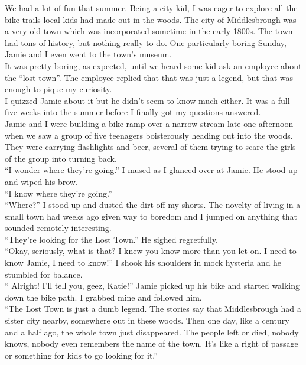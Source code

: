 \documentclass[a5paper]{scrartcl}
\begin{document}
We had a lot of fun that summer. Being a city kid, I was eager to explore all the bike trails local kids had made out in the woods. The city of Middlesbrough was a very old town which was incorporated sometime in the early 1800s. The town had tons of history, but nothing really to do. One particularly boring Sunday, Jamie and I even went to the town's museum. \\


It was pretty boring, as expected, until we heard some kid ask an employee about the \enquote{lost town}. The employee replied that that was just a legend, but that was enough to pique my curiosity.\\


I quizzed Jamie about it but he didn't seem to know much either. It was a full five weeks into the summer before I finally got my questions answered.\\


Jamie and I were building a bike ramp over a narrow stream late one afternoon when we saw a group of five teenagers boisterously heading out into the woods. They were carrying flashlights and beer, several of them trying to scare the girls of  the group into turning back.\\


\enquote{I wonder where they're going.} I mused as I glanced over at Jamie. He stood up and wiped his brow. \\


\enquote{I know where they're going.}\\


\enquote{Where?} I stood up and dusted the dirt off my shorts. The novelty of living in a small town had weeks ago given way to boredom and I jumped on anything that sounded remotely interesting.  \\


\enquote{They're looking for the Lost Town.} He sighed regretfully.\\


\enquote{Okay, seriously, what is that? I knew you know more than you let on. I need to know Jamie, I need to know!} I shook his shoulders in mock hysteria and he stumbled for balance.\\


\enquote{ Alright! I'll tell you, geez, Katie!} Jamie picked up his bike and started walking down the bike path. I grabbed mine and followed him.\\


\enquote{The Lost Town is just a dumb legend.  The stories say that Middlesbrough had a sister city nearby, somewhere out in these woods. Then one day, like a century and a half ago, the whole town just disappeared. The people left or died, nobody knows, nobody even remembers the name of the town. It's like a right of passage or something for kids to go looking for it.}\\
\end{document}
